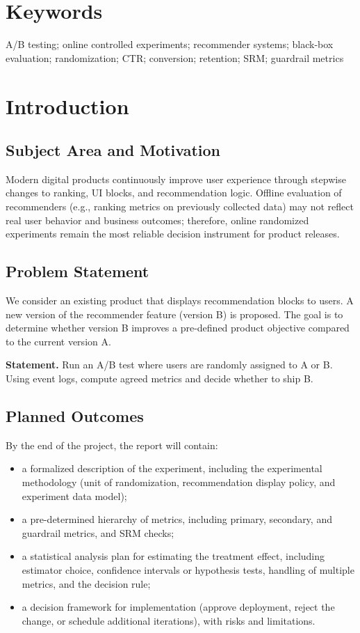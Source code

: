 \documentclass[a4paper,12pt]{extarticle}
\numberwithin{equation}{section}
\begin{document}
\section*{Keywords}
A/B testing; online controlled experiments; recommender systems; black-box
evaluation; randomization; CTR; conversion; retention; SRM; guardrail metrics

\clearpage

\section{Introduction}

\subsection{Subject Area and Motivation}
Modern digital products continuously improve user experience through stepwise
changes to ranking, UI blocks, and recommendation logic. Offline evaluation of
recommenders (e.g., ranking metrics on previously collected data) may not reflect real
user behavior and business outcomes; therefore, online randomized experiments
remain the most reliable decision instrument for product releases.

\subsection{Problem Statement}
We consider an existing product that displays recommendation blocks to users. A
new version of the recommender feature (version B) is proposed. The goal is to
determine whether version B improves a pre-defined product objective compared to
the current version A.

\textbf{Statement.}
Run an A/B test where users are randomly assigned to A or B. Using event logs,
compute agreed metrics and decide whether to ship B.

\subsection{Planned Outcomes}
By the end of the project, the report will contain:
\begin{itemize}
  \item a formalized description of the experiment, including the experimental
  methodology (unit of randomization, recommendation display policy, and
  experiment data model);
  \item a pre-determined hierarchy of metrics, including primary, secondary,
  and guardrail metrics, and SRM checks;
  \item a statistical analysis plan for estimating the treatment effect,
  including estimator choice, confidence intervals or hypothesis tests,
  handling of multiple metrics, and the decision rule;
  \item a decision framework for implementation (approve deployment, reject the
  change, or schedule additional iterations), with risks and limitations.
\end{itemize}
\end{document}
